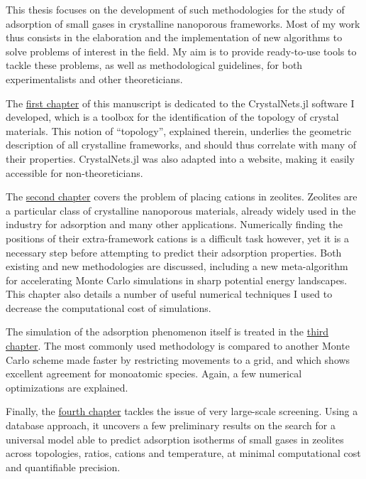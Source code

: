 \vspace{2em}

This thesis focuses on the development of such methodologies for the study of adsorption of small gases in crystalline nanoporous frameworks. Most of my work thus consists in the elaboration and the implementation of new algorithms to solve problems of interest in the field. My aim is to provide ready-to-use tools to tackle these problems, as well as methodological guidelines, for both experimentalists and other theoreticians.

The \hyperref[topology]{first chapter} of this manuscript is dedicated to the CrystalNets.jl software I developed, which is a toolbox for the identification of the topology of crystal materials. This notion of ``topology'', explained therein, underlies the geometric description of all crystalline frameworks, and should thus correlate with many of their properties. CrystalNets.jl was also adapted into a website, making it easily accessible for non-theoreticians.

The \hyperref[cationzeolites]{second chapter} covers the problem of placing cations in zeolites. Zeolites are a particular class of crystalline nanoporous materials, already widely used in the industry for adsorption and many other applications. Numerically finding the positions of their extra-framework cations is a difficult task however, yet it is a necessary step before attempting to predict their adsorption properties. Both existing and new methodologies are discussed, including a new meta-algorithm for accelerating Monte Carlo simulations in sharp potential energy landscapes. This chapter also details a number of useful numerical techniques I used to decrease the computational cost of simulations.

The simulation of the adsorption phenomenon itself is treated in the \hyperref[adsorption]{third chapter}. The most commonly used methodology is compared to another Monte Carlo scheme made faster by restricting movements to a grid, and which shows excellent agreement for monoatomic species. Again, a few numerical optimizations are explained.

Finally, the \hyperref[database]{fourth chapter} tackles the issue of very large-scale screening. Using a database approach, it uncovers a few preliminary results on the search for a universal model able to predict adsorption isotherms of small gases in zeolites across topologies, \SiAl ratios, cations and temperature, at minimal computational cost and quantifiable precision.


\vfill
\begin{center}
\end{center}
\vfill\vfill
